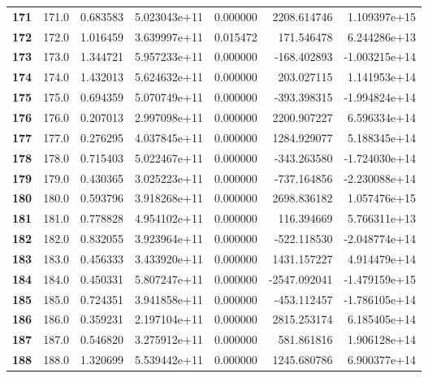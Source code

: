 \documentclass{report}[12pt]
\begin{document}
\begin{center}
\begin{tabular}{lrrrrrr}
\textbf{171 } &          171.0 &   0.683583 &  5.023043e+11 &    0.000000 &  2208.614746 &  1.109397e+15 \\
\textbf{172 } &          172.0 &   1.016459 &  3.639997e+11 &    0.015472 &   171.546478 &  6.244286e+13 \\
\textbf{173 } &          173.0 &   1.344721 &  5.957233e+11 &    0.000000 &  -168.402893 & -1.003215e+14 \\
\textbf{174 } &          174.0 &   1.432013 &  5.624632e+11 &    0.000000 &   203.027115 &  1.141953e+14 \\
\textbf{175 } &          175.0 &   0.694359 &  5.070749e+11 &    0.000000 &  -393.398315 & -1.994824e+14 \\
\textbf{176 } &          176.0 &   0.207013 &  2.997098e+11 &    0.000000 &  2200.907227 &  6.596334e+14 \\
\textbf{177 } &          177.0 &   0.276295 &  4.037845e+11 &    0.000000 &  1284.929077 &  5.188345e+14 \\
\textbf{178 } &          178.0 &   0.715403 &  5.022467e+11 &    0.000000 &  -343.263580 & -1.724030e+14 \\
\textbf{179 } &          179.0 &   0.430365 &  3.025223e+11 &    0.000000 &  -737.164856 & -2.230088e+14 \\
\textbf{180 } &          180.0 &   0.593796 &  3.918268e+11 &    0.000000 &  2698.836182 &  1.057476e+15 \\
\textbf{181 } &          181.0 &   0.778828 &  4.954102e+11 &    0.000000 &   116.394669 &  5.766311e+13 \\
\textbf{182 } &          182.0 &   0.832055 &  3.923964e+11 &    0.000000 &  -522.118530 & -2.048774e+14 \\
\textbf{183 } &          183.0 &   0.456333 &  3.433920e+11 &    0.000000 &  1431.157227 &  4.914479e+14 \\
\textbf{184 } &          184.0 &   0.450331 &  5.807247e+11 &    0.000000 & -2547.092041 & -1.479159e+15 \\
\textbf{185 } &          185.0 &   0.724351 &  3.941858e+11 &    0.000000 &  -453.112457 & -1.786105e+14 \\
\textbf{186 } &          186.0 &   0.359231 &  2.197104e+11 &    0.000000 &  2815.253174 &  6.185405e+14 \\
\textbf{187 } &          187.0 &   0.546820 &  3.275912e+11 &    0.000000 &   581.861816 &  1.906128e+14 \\
\textbf{188 } &          188.0 &   1.320699 &  5.539442e+11 &    0.000000 &  1245.680786 &  6.900377e+14 \\

\end{tabular}
\end{center}
\end{document}
